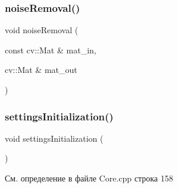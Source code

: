 \mbox{\label{group__coreh_ga438c92819ed0ad4fc2e187ed5f5a2e27}} 
\subsubsection{\texorpdfstring{noise\+Removal()}{noiseRemoval()}}
{\footnotesize\ttfamily void noise\+Removal (\begin{DoxyParamCaption}\item[{const cv\+::\+Mat \&}]{mat\+\_\+in,  }\item[{cv\+::\+Mat \&}]{mat\+\_\+out }\end{DoxyParamCaption})}

\mbox{\label{group__coreh_ga242d25c7a9a1b7212bb890023c8131f5}} 
\subsubsection{\texorpdfstring{settings\+Initialization()}{settingsInitialization()}}
{\footnotesize\ttfamily void settings\+Initialization (\begin{DoxyParamCaption}{ }\end{DoxyParamCaption})}



См. определение в файле Core.\+cpp строка 158

